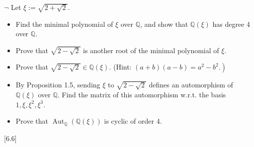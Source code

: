 \begin{problem}[1.25]
$\neg$ Let $\xi:=\sqrt{2+\sqrt{2}}$.
	\begin{itemize}
		\item Find the minimal polynomial of $\xi$ over $\mathbb{Q}$, and show that $\mathbb{Q}(\xi)$ has degree 4 over $\mathbb{Q}$.
		\item Prove that $\sqrt{2-\sqrt{2}}$ is another root of the minimal polynomial of $\xi$.
		\item Prove that $\sqrt{2-\sqrt{2}} \in \mathbb{Q}(\xi)$. (Hint: $\left.(a+b)(a-b)=a^2-b^2.\right)$
		\item By Proposition 1.5, sending $\xi$ to $\sqrt{2-\sqrt{2}}$ defines an automorphism of $\mathbb{Q}(\xi)$ over $\mathbb{Q}$. Find the matrix of this automorphism w.r.t. the basis $1, \xi, \xi^2, \xi^3$.
		\item Prove that $\operatorname{Aut}_{\mathbb{Q}}(\mathbb{Q}(\xi))$ is cyclic of order 4.
	\end{itemize}
[6.6]
\end{problem}
